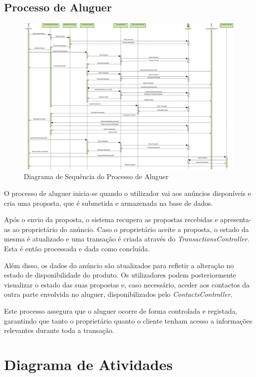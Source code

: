 \documentclass[a4paper, 12pt]{article} %
\begin{document}
\subsection{Processo de Aluguer}
\begin{figure}[ht]
	\centering
	\includegraphics[width=\textwidth]{../images/sequence-diagram-rental.png}
	\caption{Diagrama de Sequência do Processo de Aluguer}
	\label{fig:diagrama_sequencia_aluguer}
\end{figure}

O processo de aluguer inicia-se quando o utilizador vai aos anúncios disponíveis e cria uma proposta, que é submetida e armazenada na base de dados.

Após o envio da proposta, o sistema recupera as propostas recebidas e apresenta-as ao proprietário do anúncio. Caso o proprietário aceite a proposta, o estado da mesma é atualizado e uma transação é criada através do \textit{TransactionsController}. Esta é então processada e dada como concluída.

Além disso, os dados do anúncio são atualizados para refletir a alteração no estado de disponibilidade do produto. Os utilizadores podem posteriormente visualizar o estado das suas propostas e, caso necessário, aceder aos contactos da outra parte envolvida no aluguer, disponibilizados pelo \textit{ContactsController}.

Este processo assegura que o aluguer ocorre de forma controlada e registada, garantindo que tanto o proprietário quanto o cliente tenham acesso a informações relevantes durante toda a transação.

\newpage
\section*{Diagrama de Atividades}
\end{document}
